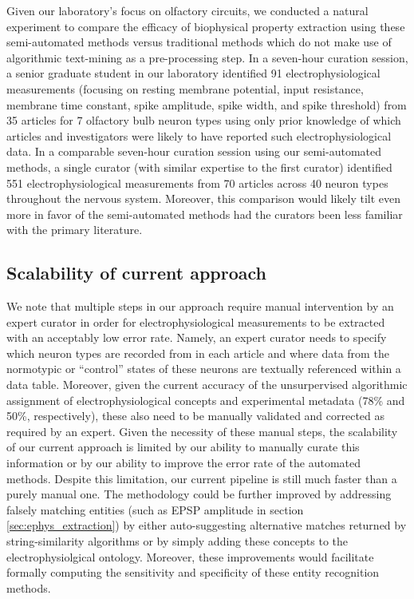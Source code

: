 \documentclass{template/frontiersSCNS} %
\begin{document}
Given our laboratory's focus on olfactory circuits, we conducted a natural experiment to compare the efficacy of biophysical property extraction using these semi-automated methods versus traditional methods which do not make use of algorithmic text-mining as a pre-processing step.  
In a seven-hour curation session, a senior graduate student in our laboratory identified 91 electrophysiological measurements (focusing on resting membrane potential, input resistance, membrane time constant, spike amplitude, spike width, and spike threshold) from 35 articles for 7 olfactory bulb neuron types using only prior knowledge of which articles and investigators were likely to have reported such electrophysiological data.  
In a comparable seven-hour curation session using our semi-automated methods, a single curator (with similar expertise to the first curator) identified 551 electrophysiological measurements from 70 articles across 40 neuron types throughout the nervous system.  
Moreover, this comparison would likely tilt even more in favor of the semi-automated methods had the curators been less familiar with the primary literature.

\subsection{Scalability of current approach}
We note that multiple steps in our approach require manual intervention by an expert curator in order for electrophysiological measurements to be extracted with an acceptably low error rate.  
Namely, an expert curator needs to specify which neuron types are recorded from in each article and where data from the normotypic or ``control'' states of these neurons are textually referenced within a data table.  
Moreover, given the current accuracy of the unsurpervised algorithmic assignment of electrophysiological concepts and experimental metadata (78\% and 50\%, respectively), these also need to be manually validated and corrected as required by an expert.  
Given the necessity of these manual steps, the scalability of our current approach is limited by our ability to manually curate this information or by our ability to improve the error rate of the automated methods.  
Despite this limitation, our current pipeline is still much faster than a purely manual one.  The methodology could be further improved by addressing falsely matching entities (such as EPSP amplitude in section \ref{sec:ephys_extraction}) by either auto-suggesting alternative matches returned by string-similarity algorithms or by simply adding these concepts to the electrophysiolgical ontology.  
Moreover, these improvements would facilitate formally computing the sensitivity and specificity of these entity recognition methods.
\end{document}
